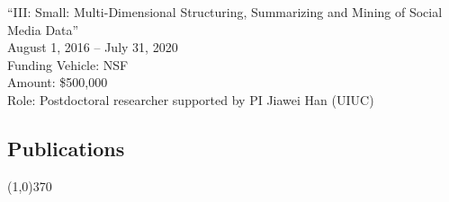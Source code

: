 \documentclass[10pt]{article}
\newenvironment{myindentpar}[1]%
{\begin{list}{}%
         {\setlength{\leftmargin}{#1}}%
         \item[]%
}
{\end{list}}
\newcounter{list}
\begin{document}
\begin{myindentpar}{0.75cm}
\hspace{-0.75cm}``III: Small: Multi-Dimensional Structuring, Summarizing and Mining of Social Media Data''\\
August 1, 2016 -- July 31, 2020 \\
Funding Vehicle: NSF \\
Amount: \$500,000 \\
Role: Postdoctoral researcher supported by PI Jiawei Han (UIUC)

\end{myindentpar}

\newpage

\vspace{-0.6cm}
\subsection{}
\subsection{\sc Publications}
\vspace{-0.4cm} \line(1,0){370} \vspace{-0.1cm}
\end{document}
